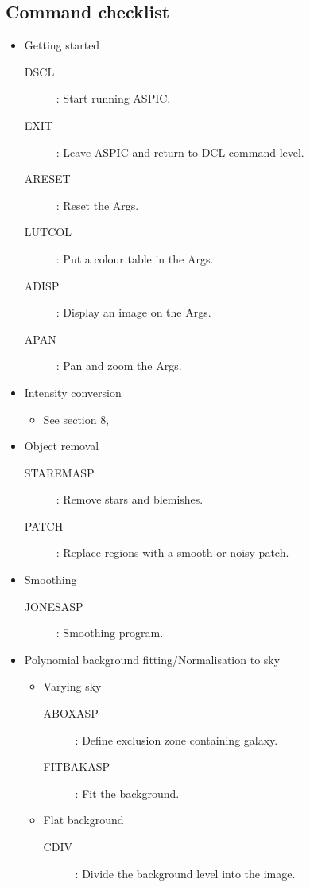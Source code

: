 \subsection {Command checklist}
\begin{itemize}
\item Getting started
\begin{description}
\item [DSCL]: Start running ASPIC.
\item [EXIT]: Leave ASPIC and return to DCL command level.
\item [ARESET]: Reset the Args.
\item [LUTCOL]: Put a colour table in the Args.
\item [ADISP]: Display an image on the Args.
\item [APAN]: Pan and zoom the Args.
\end{description}
\item Intensity conversion
\begin{itemize}
\item See section 8,
\end{itemize}
\item Object removal
\begin{description}
\item [STAREMASP]: Remove stars and blemishes.
\item [PATCH]: Replace regions with a smooth or noisy patch.
\end{description}
\item Smoothing
\begin{description}
\item [JONESASP]: Smoothing program.
\end{description}
\item Polynomial background fitting/Normalisation to sky
\begin{itemize}
\item Varying sky
\begin{description}
\item [ABOXASP]: Define exclusion zone containing galaxy.
\item [FITBAKASP]: Fit the background.
\end{description}
\item Flat background
\begin{description}
\item [CDIV]: Divide the background level into the image.
\end{description}
\end{itemize}

\end{itemize}
